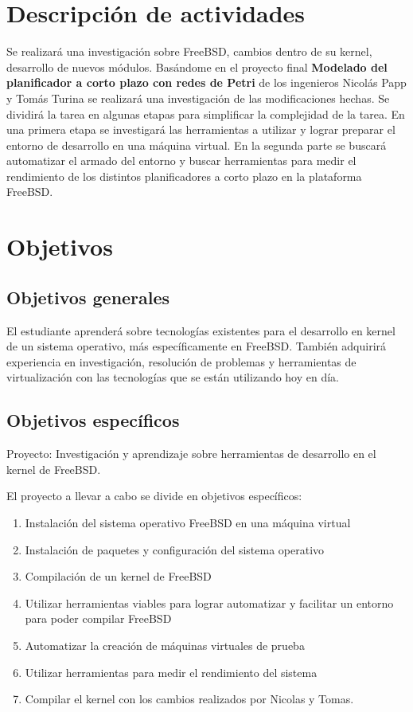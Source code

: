 \documentclass[a4paper, 11pt]{article}
\begin{document}
\section*{Descripción de actividades}

\vspace{0.4cm}
\large
Se realizará una investigación sobre FreeBSD, cambios dentro de su kernel, desarrollo de nuevos módulos. Basándome en el proyecto final \textbf{Modelado del planificador a corto plazo con redes de Petri} de los ingenieros Nicolás Papp y Tomás Turina se realizará una investigación de las modificaciones hechas. Se dividirá la tarea en algunas etapas para simplificar la complejidad de la tarea.
En una primera etapa se investigará las herramientas a utilizar y lograr preparar el entorno de desarrollo en una máquina virtual. En la segunda parte se buscará automatizar el armado del entorno y buscar herramientas para medir el rendimiento de los distintos planificadores a corto plazo en la plataforma FreeBSD.

\newpage

\section*{Objetivos}
\subsection*{Objetivos generales}

El estudiante aprenderá sobre tecnologías existentes para el desarrollo en kernel de un sistema operativo, más específicamente en FreeBSD. También adquirirá experiencia en investigación, resolución de problemas y herramientas de virtualización con las tecnologías que se están utilizando hoy en día.

\vspace{0.7cm}
\subsection*{Objetivos específicos}

Proyecto: Investigación y aprendizaje sobre herramientas de desarrollo en el kernel de FreeBSD.

\vspace{0.5cm}
El proyecto a llevar a cabo se divide en objetivos específicos:

\begin{enumerate}
	\item Instalación del sistema operativo FreeBSD en una máquina virtual
	\item Instalación de paquetes y configuración del sistema operativo
	\item Compilación de un kernel de FreeBSD
	\item Utilizar herramientas viables para lograr automatizar y facilitar un entorno para poder compilar FreeBSD
	\item Automatizar la creación de máquinas virtuales de prueba
	\item Utilizar herramientas para medir el rendimiento del sistema
	\item Compilar el kernel con los cambios realizados por Nicolas y Tomas.
\end{enumerate}
\newpage
\end{document}
